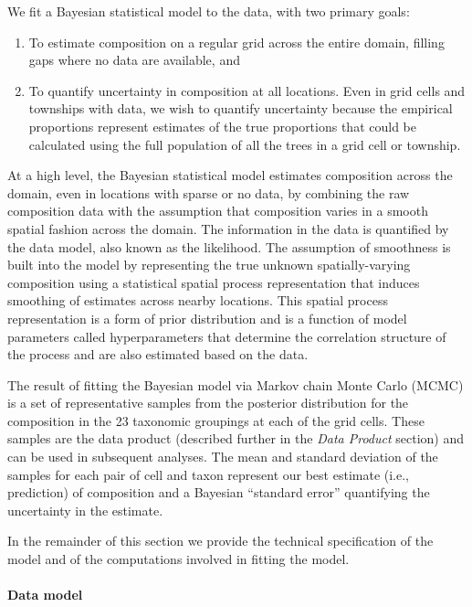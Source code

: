 \documentclass[10pt,letterpaper]{article}
\begin{document}
We fit a Bayesian statistical model to the data, with two primary
goals:
\begin{enumerate}
\item To estimate composition on a regular grid across the entire domain,
filling gaps where no data are available, and
\item To quantify uncertainty in composition at all locations. Even in grid
cells and townships with data, we wish to quantify uncertainty because
the empirical proportions represent estimates of the true proportions
that could be calculated using the full population of all the trees
in a grid cell or township.
\end{enumerate}
At a high level, the Bayesian statistical model estimates
composition across the domain, even in locations with sparse or no
data, by combining the raw composition data with the assumption that
composition varies in a smooth spatial fashion across the domain.
The information in the data is quantified by the data model, also
known as the likelihood. The assumption of smoothness is built into
the model by representing the true unknown spatially-varying composition
using a statistical spatial process representation that induces smoothing
of estimates across nearby locations. This spatial process representation
is a form of prior distribution and is a function of model parameters
called hyperparameters that determine the correlation structure of
the process and are also estimated based on the data. 

The result of fitting the Bayesian model via Markov chain Monte Carlo
(MCMC) is a set of representative samples from the posterior distribution
for the composition in the 23 taxonomic groupings at each of the grid
cells. These samples are the data product (described further in the
\emph{Data Product} section) and can be used in subsequent analyses.
The mean and standard deviation of the samples for each pair of cell
and taxon represent our best estimate (i.e., prediction) of composition
and a Bayesian ``standard error'' quantifying the uncertainty in
the estimate. 

In the remainder of this section we provide the technical
specification of the model and of the computations involved in fitting
the model.



\paragraph*{Data model}
\end{document}
